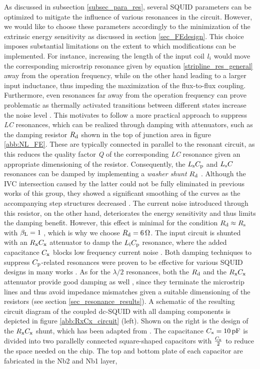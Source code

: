 As discussed in subsection \ref{subsec_para_res}, several SQUID parameters can be optimized to mitigate the influence of various resonances in the circuit. However, we would like to choose these parameters accordingly to the minimization of the extrinsic energy sensitivity as discussed in section \ref{sec_FEdesign}. This choice imposes substantial limitations on the extent to which modifications can be implemented. For instance, increasing the length of the input coil $l_{\rm i}$ would move the corresponding microstrip resonance given by equation \ref{stripline_res_general} away from the operation frequency, while on the other hand leading to a larger input inductance, thus impeding the maximization of the flux-to-flux coupling. Furthermore, even resonances far away from the operation frequency can prove problematic as thermally activated transitions between different states increase the noise level \cite{Sepp1987}. This motivates to follow a more practical approach to suppress \textit{LC} resonances, which can be realized through damping with attenuators, such as the damping resistor $R_{\rm d}$ shown in the top of junction area in figure \ref{abb:NL_FE}. These are typically connected in parallel to the resonant circuit, as this reduces the quality factor \textit{Q} of the corresponding \textit{LC} resonance given an appropriate dimensioning of the resistor. Consequently, the $L_{\rm s}C_{\rm p}$ and $L_{\rm s}C$ resonances can be damped by implementing a \textit{washer shunt} $R_{\rm d}$ \cite{Ono1997, Ryh1992}. Although the IVC intersection caused by the latter could not be fully eliminated in previous works of this group, they showed a significant smoothing of the curves as the accompanying step structures decreased \cite{Bauer2018}. The current noise introduced through this resistor, on the other hand, deteriorates the energy sensitivity and thus limits the damping benefit. However, this effect is minimal for the condition $R_{\rm d}\approx R_{\rm s}$ with $\beta_{\rm L}=1$ \cite{Enpuku1986, Ryh1992}, which is why we choose $R_{\rm d}=\qty{6}{\ohm}$. The input circuit is shunted with an $R_{\rm x}C_{\rm x}$ attenuator to damp the $L_{\rm i}C_{\rm p}$ resonance, where the added capacitance $C_{\rm x}$ blocks low frequency current noise \cite{Sepp1987}. Both damping techniques to suppress $C_{\rm p}$-related resonances were proven to be effective for various SQUID designs in many works \cite{Knuutila1987, Enpuku1986,Can1991,Bauer2018}. As for the $\lambda/2$ resonances, both the $R_{\rm d}$ and the $R_{\rm x}C_{\rm x}$ attenuator provide good damping as well \cite{Can1991}, since they terminate the microstrip lines and thus avoid impedance mismatches given a suitable dimensioning of the resistors (see section \ref{sec_resonance_results}). A schematic of the resulting circuit diagram of the coupled dc-SQUID with all damping components is depicted in figure \ref{abb:RxCx_circuit} (left). Shown on the right is the design of the $R_{\rm x}C_{\rm x}$ shunt, which has been adapted from \cite{Bauer2022}. The capacitance $C_{\rm x}=\qty{10}{\pico\farad}$ is divided into two parallelly connected square-shaped capacitors with $\frac{C_{\rm x}}{2}$ to reduce the space needed on the chip. The top and bottom plate of each capacitor are fabricated in the Nb2 and Nb1 layer, 